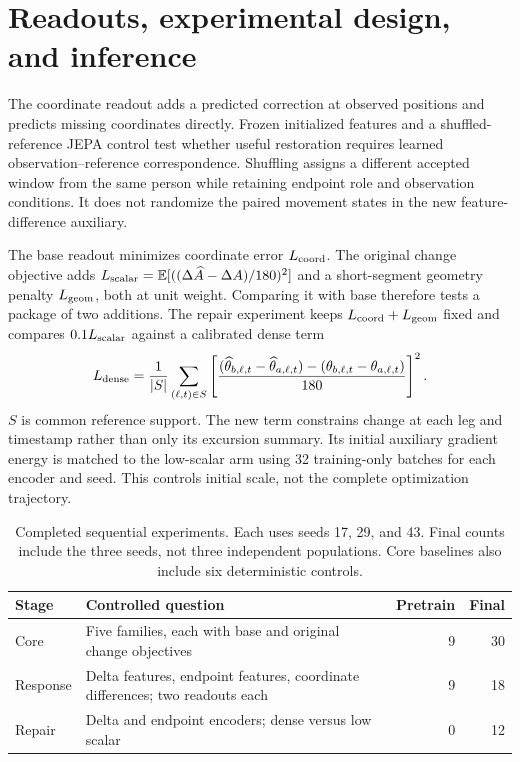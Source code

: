 \documentclass{article}
\begin{document}
\clearpage
\section{Readouts, experimental design, and inference}
The coordinate readout adds a predicted correction at observed positions and predicts missing coordinates directly. Frozen initialized features and a shuffled-reference JEPA control test whether useful restoration requires learned observation--reference correspondence. Shuffling assigns a different accepted window from the same person while retaining endpoint role and observation conditions. It does not randomize the paired movement states in the new feature-difference auxiliary.

The base readout minimizes coordinate error $L_{\rm coord}$. The original change objective adds $L_{\rm scalar}=\mathbb E[((\Delta\widehat A-\Delta A)/180)^2]$ and a short-segment geometry penalty $L_{\rm geom}$, both at unit weight. Comparing it with base therefore tests a package of two additions. The repair experiment keeps $L_{\rm coord}+L_{\rm geom}$ fixed and compares $0.1L_{\rm scalar}$ against a calibrated dense term
\begin{equation}
L_{\rm dense}=\frac{1}{|S|}\sum_{(\ell,t)\in S}
\left[\frac{(\widehat\theta_{b,\ell,t}-\widehat\theta_{a,\ell,t})-(\theta_{b,\ell,t}-\theta_{a,\ell,t})}{180}\right]^2.
\end{equation}
$S$ is common reference support. The new term constrains change at each leg and timestamp rather than only its excursion summary. Its initial auxiliary gradient energy is matched to the low-scalar arm using 32 training-only batches for each encoder and seed. This controls initial scale, not the complete optimization trajectory.

\begin{table}[h]\centering\small
\caption{Completed sequential experiments. Each uses seeds 17, 29, and 43. Final counts include the three seeds, not three independent populations. Core baselines also include six deterministic controls.}
\label{tab:matrix}
\begin{tabular}{p{.85in}p{3.0in}rr}\toprule
Stage & Controlled question & Pretrain & Final\\\midrule
Core & Five families, each with base and original change objectives &9&30\\
Response & Delta features, endpoint features, coordinate differences; two readouts each &9&18\\
Repair & Delta and endpoint encoders; dense versus low scalar &0&12\\\bottomrule
\end{tabular}\end{table}
\end{document}
